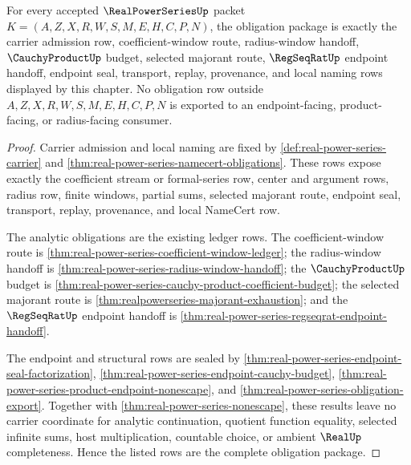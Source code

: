 \begin{theorem}
\label{thm:real-power-series-obligation-closure-ledger}
For every accepted $\RealPowerSeriesUp$ packet $K=(A,Z,X,R,W,S,M,E,H,C,P,N)$, the obligation package is exactly the carrier admission row, coefficient-window route, radius-window handoff, $\CauchyProductUp$ budget, selected majorant route, $\RegSeqRatUp$ endpoint handoff, endpoint seal, transport, replay, provenance, and local naming rows displayed by this chapter. No obligation row outside $A,Z,X,R,W,S,M,E,H,C,P,N$ is exported to an endpoint-facing, product-facing, or radius-facing consumer.
\end{theorem}
\begin{proof}
Carrier admission and local naming are fixed by \autoref{def:real-power-series-carrier} and \autoref{thm:real-power-series-namecert-obligations}. These rows expose exactly the coefficient stream or formal-series row, center and argument rows, radius row, finite windows, partial sums, selected majorant route, endpoint seal, transport, replay, provenance, and local NameCert row.

The analytic obligations are the existing ledger rows. The coefficient-window route is \autoref{thm:real-power-series-coefficient-window-ledger}; the radius-window handoff is \autoref{thm:real-power-series-radius-window-handoff}; the $\CauchyProductUp$ budget is \autoref{thm:real-power-series-cauchy-product-coefficient-budget}; the selected majorant route is \autoref{thm:realpowerseries-majorant-exhaustion}; and the $\RegSeqRatUp$ endpoint handoff is \autoref{thm:real-power-series-regseqrat-endpoint-handoff}.

The endpoint and structural rows are sealed by \autoref{thm:real-power-series-endpoint-seal-factorization}, \autoref{thm:real-power-series-endpoint-cauchy-budget}, \autoref{thm:real-power-series-product-endpoint-nonescape}, and \autoref{thm:real-power-series-obligation-export}. Together with \autoref{thm:real-power-series-nonescape}, these results leave no carrier coordinate for analytic continuation, quotient function equality, selected infinite sums, host multiplication, countable choice, or ambient $\RealUp$ completeness. Hence the listed rows are the complete obligation package.
\end{proof}


